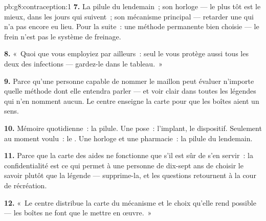 \begin{solution}{pb:g8:contraception:1}
\textbf{7.} La pilule du lendemain~; son horloge --- le plus tôt est
le mieux, dans les jours qui suivent~; son mécanisme principal ---
retarder une  qui n'a pas encore eu lieu. Pour la suite~:
une méthode permanente bien choisie --- le frein n'est pas le
système de freinage.

\textbf{8.} «~Quoi que vous employiez par ailleurs~: seul le
 vous protège aussi tous les deux des infections ---
gardez-le dans le tableau.~»

\textbf{9.} Parce qu'une personne capable de nommer le maillon peut
évaluer n'importe quelle méthode dont elle entendra parler --- et
voir clair dans toutes les légendes qui n'en nomment aucun. Le centre
enseigne la carte pour que les boîtes aient un sens.

\textbf{10.} Mémoire quotidienne~: la pilule. Une pose~: l'implant,
le dispositif. Seulement au moment voulu~: le . Une
horloge et une pharmacie~: la pilule du lendemain.

\textbf{11.} Parce que la carte des aides ne fonctionne que s'il est
sûr de s'en servir~: la confidentialité est ce qui permet à une
personne de dix-sept ans de choisir le savoir plutôt que la
légende --- supprime-la, et les questions retournent à la cour de
récréation.

\textbf{12.} «~Le centre distribue la carte du mécanisme et le choix
qu'elle rend possible --- les boîtes ne font que le mettre en
œuvre.~»
\end{solution}

